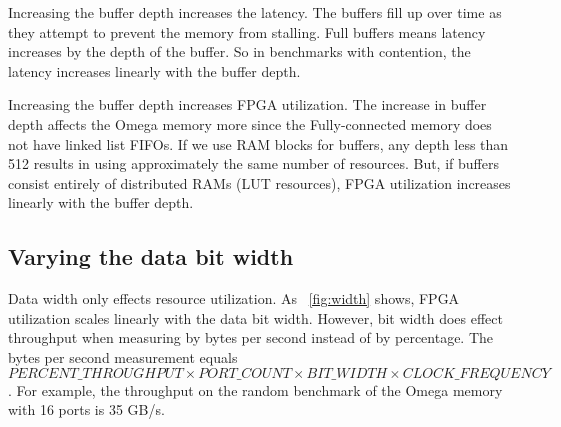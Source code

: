 Increasing the buffer depth increases the latency. The buffers fill up over time as they attempt to prevent the memory from stalling. Full buffers means latency increases by the depth of the buffer. So in benchmarks with contention, the latency increases linearly with the buffer depth.

Increasing the buffer depth increases FPGA utilization. The increase in buffer depth affects the Omega memory more since the Fully-connected memory does not have linked list FIFOs. If we use RAM blocks for buffers, any depth less than 512 results in using approximately the same number of resources. But, if buffers consist entirely of distributed RAMs (LUT resources), FPGA utilization increases linearly with the buffer depth.

\subsection{Varying the data bit width} Data width only effects resource utilization. As \figurename~\ref{fig:width} shows, FPGA utilization scales linearly with the data bit width. However, bit width does effect throughput when measuring by bytes per second instead of by percentage. The bytes per second measurement equals $PERCENT\_THROUGHPUT \times PORT\_COUNT \times BIT\_WIDTH \times CLOCK\_FREQUENCY$. For example, the throughput on the random benchmark of the Omega memory with 16 ports is 35 GB/s.

